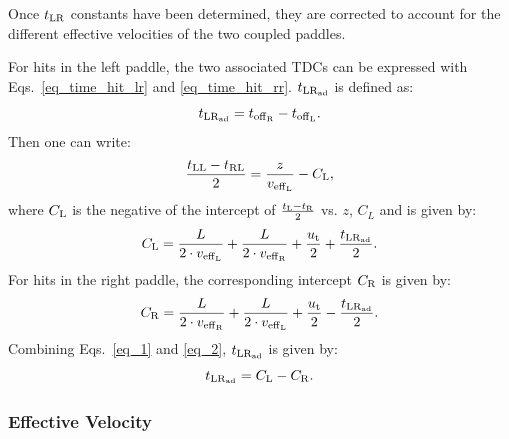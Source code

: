 %
Once $t_{\rm{LR}}$ constants have been determined, they are corrected to account for the different effective velocities of the two coupled paddles.

For hits in the left paddle, the two associated TDCs can be expressed with Eqs.~\ref{eq_time_hit_lr} and \ref{eq_time_hit_rr}. 
%
$t_{\rm{LR}_{\rm{ad}}}$ is defined as:
\begin{equation}
t_{\rm{LR}_{\rm{ad}}}=t_{\rm{off}_{\rm{R}}}-t_{\rm{off}_{\rm{L}}}.
\end{equation}
%
Then one can write:
\begin{equation}\label{eq_15}
\frac{t_{\rm{LL}}-t_{\rm{RL}}}{2}=\frac{z}{v_{\rm{eff}_{\rm{L}}}}-C_{\rm{L}},
\end{equation}
where $C_{\rm{L}}$ is the negative of the intercept of $\frac{t_{\rm{L}}-t_{\rm{R}}}{2}$ vs. $z$, $C_L$ and is
given by:
\begin{equation}
\label{eq_1}
C_{\rm{L}}=\frac{L}{2\cdot v_{\rm{eff}_{\rm{L}}}}+\frac{L}{2\cdot v_{\rm{eff}_{\rm{R}}}}+\frac{u_{\rm{t}}}{2}+\frac{t_{\rm{LR}_{\rm{ad}}}}{2}.
\end{equation}
For hits in the right paddle, the corresponding intercept $C_{\rm{R}}$ is given by:
\begin{equation}
\label{eq_2}
C_{\rm{R}}=\frac{L}{2\cdot v_{\rm{eff}_{\rm{R}}}}+\frac{L}{2\cdot v_{\rm{eff}_{\rm{L}}}}+\frac{u_{\rm{t}}}{2}-\frac{t_{\rm{LR}_{\rm{ad}}}}{2}.
\end{equation}
Combining Eqs.~\ref{eq_1} and \ref{eq_2}, $t_{\rm{LR}_{\rm{ad}}}$ is given by:
\begin{equation}
t_{\rm{LR}_{\rm{ad}}}=C_{\rm{L}}-C_{\rm{R}}.
\end{equation}

\subsubsection{Effective Velocity}

